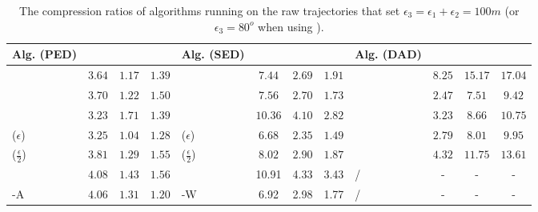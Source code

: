 {\begin{table}
	\caption{\small The compression ratios of algorithms running on the raw trajectories that set $\epsilon_3=\epsilon_1+\epsilon_2=100m$ (or $\epsilon_3=80^o$ when using \dad).}
	\centering
	\scriptsize
	\begin{tabular}{|l|c|c|c|l|c|c|c|l|c|c|c|}
		\hline
		\bf{Alg. (PED)}  &\ucar &\geolife &\mopsi & \bf{Alg. (SED)}  &\ucar &\geolife &\mopsi &\bf{Alg. (DAD)}  &\ucar &\geolife &\mopsi \\
		\hline
		{\dpa} &	$3.64$ & $ 1.17$ &	$1.39$	&\dpa &$7.44$ & $2.69$ &$1.91$  & \dpa	& $8.25$	& $15.17$	& $17.04$ \\
		\hline
		{\tpa} &	$3.70 $ & $1.22$ &	$1.50 $	&\tpa 	& $7.56 $& $2.70$ & $1.73 $ & \tpa	& $2.47 $	& $ 	7.51 $	& $ 	9.42  $ \\
		\hline
		{\bqsa} &	$3.23$ & $1.71$ &	$1.39 $	&\squishe &$10.36 $ & $4.10  $ & $2.82$ & \opwa	& $3.23$	& $8.66$	& $10.75$ \\
		\hline
		{\siped($\epsilon$)} &	$3.25$ & $ 1.04$ &	$1.28 $	&\cised($\epsilon$) & $6.68 $ &$ 2.35$ &$ 1.49	$ & \interval	& $2.79 $	& $8.01$	& $9.95 $ \\
		\hline
		{\siped($\frac{\epsilon}{2}$)} &	$3.81 $ & $1.29 $ &	$1.55 $ &\cised($\frac{\epsilon}{2}$) &$8.02  $ & $2.90$ & $1.87$& \intersec	& $4.32 $	& $11.75$	& $13.61 $ \\
		\hline
		{\operb} &	$4.08 $ & $1.43 $ & $1.56 $	& {\dagots} &10.91 &4.33 &3.43 & /&- &- &- \\
		\hline
		{\operb-A} &	${4.06} $ & ${1.31} $ & ${1.20} $	& {\cised-W} &6.92 &2.98 &1.77 & / &- &- &- \\
		\hline
	\end{tabular}
	\label{tab:cr}	
	\vspace{-1ex}
\end{table}

}
